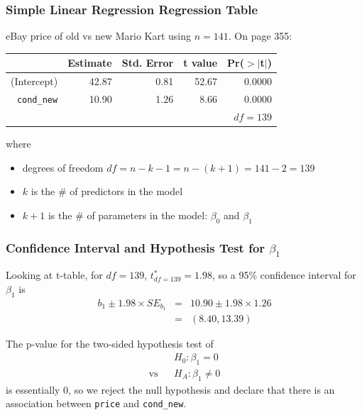 \documentclass[handout]{beamer}
\newcommand{\blue}[1]{\textcolor{blue2}{#1}}
\begin{document}
\begin{frame}[fragile]
\frametitle{Simple Linear Regression Regression Table}

eBay price of old vs new Mario Kart using $n=141$.  On page 355:

\begin{table}[ht]
\centering
\begin{tabular}{r|rrrr}
  \hline
 & Estimate & Std. Error & t value & Pr($>$$|$t$|$) \\ 
  \hline
(Intercept) & 42.87 & 0.81 & 52.67 & 0.0000 \\ 
{\tt cond\_new} & 10.90 & 1.26 & 8.66 & 0.0000 \\ 
   \hline
   & & & & $df=139$\\
\end{tabular}
\end{table}

%
%
\pause where
\begin{itemize}
\item degrees of freedom $df=n-k-1 = n -(k+1) =141-2=139$
\item $k$ is the \# of predictors in the model
\item $k+1$ is the \# of parameters in the model: $\beta_0$ and $\beta_1$
\end{itemize}

\end{frame}


\begin{frame}[fragile]
\frametitle{Confidence Interval and Hypothesis Test for $\beta_1$}
%
%
Looking at t-table, for $df=139$, $t^*_{df=139} = 1.98$, so a 95\% confidence interval for $\beta_1$ is
\begin{eqnarray*}
b_1 \pm 1.98 \times SE_{b_1} &=& 10.90 \pm 1.98 \times 1.26\\
&=& (8.40, 13.39)
\end{eqnarray*}

\pause\vspace{0.5cm}

The p-value for the two-sided hypothesis test of
\begin{eqnarray*}
&& H_0: \beta_1 = 0\\
\mbox{vs}&& H_A: \beta_1 \neq 0 
\end{eqnarray*}
is essentially 0, so we \blue{reject the null hypothesis} and declare that there is an association between {\tt price} and {\tt cond\_new}.

\end{frame}
\end{document}
